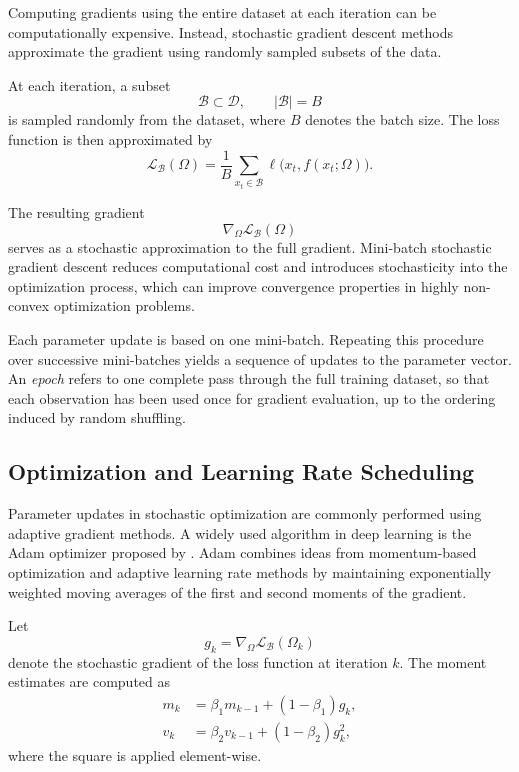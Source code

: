 Computing gradients using the entire dataset at each iteration can be computationally expensive. Instead, stochastic gradient descent methods approximate the gradient using randomly sampled subsets of the data.

At each iteration, a subset
\begin{equation}
\mathcal{B} \subset \mathcal{D}, \qquad |\mathcal{B}| = B
\end{equation}
is sampled randomly from the dataset, where \(B\) denotes the batch size. The loss function is then approximated by
\begin{equation}
\mathcal{L}_{\mathcal{B}}(\Omega)
=
\frac{1}{B}
\sum_{x_t \in \mathcal{B}}
\ell\big(x_t, f(x_t;\Omega)\big).
\end{equation}

The resulting gradient
\begin{equation}
\nabla_{\Omega}\mathcal{L}_{\mathcal{B}}(\Omega)
\end{equation}
serves as a stochastic approximation to the full gradient. Mini-batch stochastic gradient descent reduces computational cost and introduces stochasticity into the optimization process, which can improve convergence properties in highly non-convex optimization problems.

Each parameter update is based on one mini-batch. Repeating this procedure over successive mini-batches yields a sequence of updates to the parameter vector. An \emph{epoch} refers to one complete pass through the full training dataset, so that each observation has been used once for gradient evaluation, up to the ordering induced by random shuffling.


\subsection{Optimization and Learning Rate Scheduling}

Parameter updates in stochastic optimization are commonly performed using adaptive gradient methods. A widely used algorithm in deep learning is the Adam optimizer proposed by \citet{Kingma2015}. Adam combines ideas from momentum-based optimization and adaptive learning rate methods by maintaining exponentially weighted moving averages of the first and second moments of the gradient.

Let
\begin{equation}
g_k = \nabla_{\Omega}\mathcal{L}_{\mathcal{B}}(\Omega_k)
\end{equation}
denote the stochastic gradient of the loss function at iteration $k$. The moment estimates are computed as
\begin{align}
m_k &= \beta_1 m_{k-1} + (1-\beta_1) g_k, \\
v_k &= \beta_2 v_{k-1} + (1-\beta_2) g_k^2,
\end{align}
where the square is applied element-wise.

